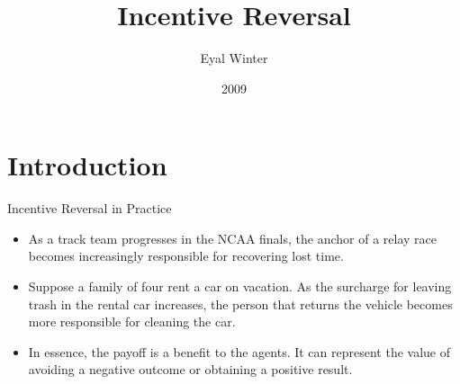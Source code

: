 \documentclass{beamer}
\title[Economics]{Incentive Reversal}
\author{Eyal Winter}
\institute{HUJI}
\date{2009}
\begin{document}
\begin{frame}
  \titlepage
\end{frame}



\section{Introduction}

\begin{frame}{Incentive Reversal in Practice}

\begin{itemize}
  \item As a track team progresses in the NCAA finals, the anchor of a relay race becomes increasingly responsible for recovering lost time.
  
  \item Suppose a family of four rent a car on vacation. As the surcharge for leaving trash in the rental car increases, the person that returns the vehicle becomes more responsible for cleaning the car.
  
  \item In essence, the payoff is a benefit to the agents. It can represent the value of avoiding a negative outcome or obtaining a positive result.

\end{itemize}

\end{frame}
\end{document}
